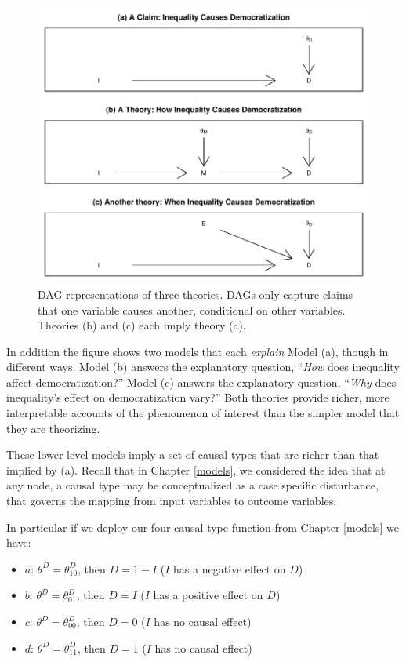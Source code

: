 \documentclass[
  12pt,
]{book}
\providecommand{\tightlist}{%
  \setlength{\itemsep}{0pt}\setlength{\parskip}{0pt}}
\begin{document}
\begin{figure}

{\centering \includegraphics[width=.5\textwidth]{ii_files/figure-latex/demtheory5-1} 

}

\caption{DAG representations of three theories. DAGs only capture claims that one variable causes another, conditional on other variables. Theories (b) and (c) each imply theory (a).}\label{fig:demtheory5}
\end{figure}

In addition the figure shows two models that each \emph{explain} Model (a), though in different ways. Model (b) answers the explanatory question, ``\emph{How} does inequality affect democratization?'' Model (c) answers the explanatory question, ``\emph{Why} does inequality's effect on democratization vary?'' Both theories provide richer, more interpretable accounts of the phenomenon of interest than the simpler model that they are theorizing.

These lower level models imply a set of causal types that are richer than that implied by (a). Recall that in Chapter \ref{models}, we considered the idea that at any node, a causal type may be conceptualized as a case specific disturbance, that governs the mapping from input variables to outcome variables.

In particular if we deploy our four-causal-type function from Chapter \ref{models} we have:

\begin{itemize}
\tightlist
\item
  \(a\): \(\theta^D=\theta^D_{10}\), then \(D=1-I\) (\(I\) has a negative effect on \(D\))
\item
  \(b\): \(\theta^D=\theta^D_{01}\), then \(D=I\) (\(I\) has a positive effect on \(D\))
\item
  \(c\): \(\theta^D=\theta^D_{00}\), then \(D=0\) (\(I\) has no causal effect)
\item
  \(d\): \(\theta^D=\theta^D_{11}\), then \(D=1\) (\(I\) has no causal effect)
\end{itemize}
\end{document}
